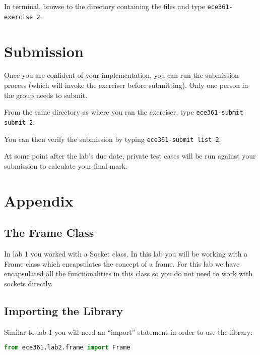 \documentclass[11pt]{article}
\def\thelab{2}
\begin{document}
In terminal, browse to the directory containing the files and type \texttt{ece361-exercise \thelab}.


\section{Submission}
\label{sec:submission}
Once you are confident of your implementation, you can run the submission process (which will invoke the exerciser before submitting).
Only one person in the group needs to submit.

From the same directory as where you ran the exerciser, type \texttt{ece361-submit submit \thelab}.

You can then verify the submission by typing \texttt{ece361-submit list \thelab}.

At some point after the lab's due date, private test cases will be run against your submission to calculate your final mark.

\appendix
\section{Appendix}
\label{sec:appendix}
\subsection{The Frame Class}
In lab 1 you worked with a Socket class. In this lab you will be working with a Frame class which encapsulates the concept of a frame. For this lab we have encapsulated all the functionalities in this class so you do not need to work with sockets directly.

\subsection{Importing the Library}
Similar to lab 1 you will need an ``import'' statement in order to use the library:
\begin{lstlisting}[caption={Import Statement}, language=python]
from ece361.lab2.frame import Frame
\end{lstlisting}
\end{document}
